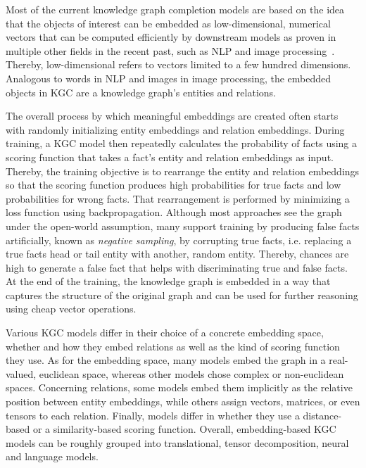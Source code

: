 Most of the current knowledge graph completion models are based on the idea that the objects of interest can be embedded as low-dimensional, numerical vectors that can be computed efficiently by downstream models as proven in multiple other fields in the recent past, such as NLP and image processing~\cite{Wang2017KnowledgeGE}. Thereby, low-dimensional refers to vectors limited to a few hundred dimensions. Analogous to words in NLP and images in image processing, the embedded objects in KGC are a knowledge graph's entities and relations.

The overall process by which meaningful embeddings are created often starts with randomly initializing entity embeddings and relation embeddings. During training, a KGC model then repeatedly calculates the probability of facts using a scoring function that takes a fact's entity and relation embeddings as input. Thereby, the training objective is to rearrange the entity and relation embeddings so that the scoring function produces high probabilities for true facts and low probabilities for wrong facts. That rearrangement is performed by minimizing a loss function using backpropagation. Although most approaches see the graph under the open-world assumption, many support training by producing false facts artificially, known as \emph{negative sampling}, by corrupting true facts, i.e. replacing a true facts head or tail entity with another, random entity. Thereby, chances are high to generate a false fact that helps with discriminating true and false facts. At the end of the training, the knowledge graph is embedded in a way that captures the structure of the original graph and can be used for further reasoning using cheap vector operations.

Various KGC models differ in their choice of a concrete embedding space, whether and how they embed relations as well as the kind of scoring function they use. As for the embedding space, many models embed the graph in a real-valued, euclidean space, whereas other models chose complex or non-euclidean spaces. Concerning relations, some models embed them implicitly as the relative position between entity embeddings, while others assign vectors, matrices, or even tensors to each relation. Finally, models differ in whether they use a distance-based or a similarity-based scoring function. Overall, embedding-based KGC models can be roughly grouped into translational, tensor decomposition, neural and language models.

